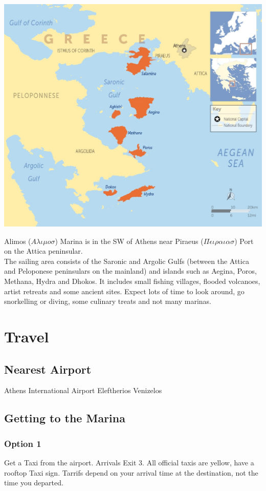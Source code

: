 \documentclass[12pt,a4paper,oneside]{article}
\begin{document}
\begin{multicols}{2}

\noindent \includegraphics[scale=0.25]{saronic-map.jpg} 

\noindent Alimos ($ A\lambda\iota\mu o \sigma $) Marina is in the SW of Athens near Piraeus ($ \Pi\epsilon\iota\rho\alpha\iota\alpha\sigma $) Port on the Attica peninsular.\\
The sailing area consists of the Saronic and Argolic Gulfs (between the Attica and Peloponese peninsulars on the mainland) and islands such as Aegina, Poros, Methana, Hydra and Dhokos.  It includes small fishing villages, flooded volcanoes, artist retreats and some ancient sites.  Expect lots of time to look around, go snorkelling or diving, some culinary treats and not many marinas.


\section*{Travel}
\subsection*{Nearest Airport}
Athens International Airport Eleftherios Venizelos

\subsection*{Getting to the Marina}
\subsubsection*{Option 1}
Get a Taxi from the airport.  Arrivals Exit 3.  All official taxis are yellow, have a rooftop Taxi sign.  Tarrifs depend on your arrival time at the destination, not the time you departed.

\end{multicols}
\end{document}
